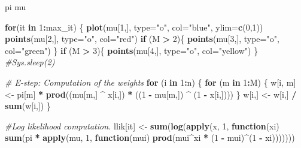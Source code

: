 \documentclass[
]{article}
\newenvironment{Shaded}{\begin{snugshade}}{\end{snugshade}}
\newcommand{\AttributeTok}[1]{\textcolor[rgb]{0.13,0.29,0.53}{#1}}
\newcommand{\CommentTok}[1]{\textcolor[rgb]{0.56,0.35,0.01}{\textit{#1}}}
\newcommand{\ControlFlowTok}[1]{\textcolor[rgb]{0.13,0.29,0.53}{\textbf{#1}}}
\newcommand{\DecValTok}[1]{\textcolor[rgb]{0.00,0.00,0.81}{#1}}
\newcommand{\FunctionTok}[1]{\textcolor[rgb]{0.13,0.29,0.53}{\textbf{#1}}}
\newcommand{\NormalTok}[1]{#1}
\newcommand{\OtherTok}[1]{\textcolor[rgb]{0.56,0.35,0.01}{#1}}
\newcommand{\SpecialCharTok}[1]{\textcolor[rgb]{0.81,0.36,0.00}{\textbf{#1}}}
\newcommand{\StringTok}[1]{\textcolor[rgb]{0.31,0.60,0.02}{#1}}
\begin{document}
\begin{Shaded}
\begin{Highlighting}[]
\NormalTok{    pi}
\NormalTok{    mu}

    \ControlFlowTok{for}\NormalTok{(it }\ControlFlowTok{in} \DecValTok{1}\SpecialCharTok{:}\NormalTok{max\_it) \{}
    \FunctionTok{plot}\NormalTok{(mu[}\DecValTok{1}\NormalTok{,], }\AttributeTok{type=}\StringTok{"o"}\NormalTok{, }\AttributeTok{col=}\StringTok{"blue"}\NormalTok{, }\AttributeTok{ylim=}\FunctionTok{c}\NormalTok{(}\DecValTok{0}\NormalTok{,}\DecValTok{1}\NormalTok{))}
    \FunctionTok{points}\NormalTok{(mu[}\DecValTok{2}\NormalTok{,], }\AttributeTok{type=}\StringTok{"o"}\NormalTok{, }\AttributeTok{col=}\StringTok{"red"}\NormalTok{)}
    \ControlFlowTok{if}\NormalTok{ (M }\SpecialCharTok{\textgreater{}} \DecValTok{2}\NormalTok{)\{}
        \FunctionTok{points}\NormalTok{(mu[}\DecValTok{3}\NormalTok{,], }\AttributeTok{type=}\StringTok{"o"}\NormalTok{, }\AttributeTok{col=}\StringTok{"green"}\NormalTok{)}
\NormalTok{    \}}
    \ControlFlowTok{if}\NormalTok{ (M }\SpecialCharTok{\textgreater{}} \DecValTok{3}\NormalTok{)\{}
        \FunctionTok{points}\NormalTok{(mu[}\DecValTok{4}\NormalTok{,], }\AttributeTok{type=}\StringTok{"o"}\NormalTok{, }\AttributeTok{col=}\StringTok{"yellow"}\NormalTok{)}
\NormalTok{    \}}
    \CommentTok{\#Sys.sleep(2)}

    \CommentTok{\# E{-}step: Computation of the weights}
    \ControlFlowTok{for}\NormalTok{ (i }\ControlFlowTok{in} \DecValTok{1}\SpecialCharTok{:}\NormalTok{n) \{}
        \ControlFlowTok{for}\NormalTok{ (m }\ControlFlowTok{in} \DecValTok{1}\SpecialCharTok{:}\NormalTok{M) \{}
\NormalTok{        w[i, m] }\OtherTok{\textless{}{-}}\NormalTok{ pi[m] }\SpecialCharTok{*} \FunctionTok{prod}\NormalTok{((mu[m,] }\SpecialCharTok{\^{}}\NormalTok{ x[i,]) }\SpecialCharTok{*}\NormalTok{ ((}\DecValTok{1} \SpecialCharTok{{-}}\NormalTok{ mu[m,]) }\SpecialCharTok{\^{}}\NormalTok{ (}\DecValTok{1} \SpecialCharTok{{-}}\NormalTok{ x[i,])))}
\NormalTok{        \}}
\NormalTok{        w[i,] }\OtherTok{\textless{}{-}}\NormalTok{ w[i,] }\SpecialCharTok{/} \FunctionTok{sum}\NormalTok{(w[i,])}
\NormalTok{    \}}

    \CommentTok{\#Log likelihood computation.}
\NormalTok{    llik[it] }\OtherTok{\textless{}{-}} \FunctionTok{sum}\NormalTok{(}\FunctionTok{log}\NormalTok{(}\FunctionTok{apply}\NormalTok{(x, }\DecValTok{1}\NormalTok{, }
        \ControlFlowTok{function}\NormalTok{(xi) }\FunctionTok{sum}\NormalTok{(pi }\SpecialCharTok{*} \FunctionTok{apply}\NormalTok{(mu, }\DecValTok{1}\NormalTok{, }\ControlFlowTok{function}\NormalTok{(mui) }
                    \FunctionTok{prod}\NormalTok{(mui}\SpecialCharTok{\^{}}\NormalTok{xi }\SpecialCharTok{*}\NormalTok{ (}\DecValTok{1} \SpecialCharTok{{-}}\NormalTok{ mui)}\SpecialCharTok{\^{}}\NormalTok{(}\DecValTok{1} \SpecialCharTok{{-}}\NormalTok{ xi)))))))}


\end{Highlighting}
\end{Shaded}
\end{document}
